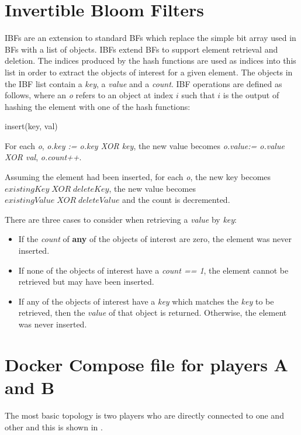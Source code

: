 \begin{appendices}

\chapter{Invertible Bloom Filters}\label{app:IBF}


IBFs are an extension to standard BFs which replace the simple bit array used in BFs with a list of objects. IBFs extend BFs to support element retrieval and deletion. The indices produced by the hash functions are used as indices into this list in order to extract the objects of interest for a given element. The objects in the IBF list contain a \textit{key}, a \textit{value} and a \textit{count}. IBF operations are defined as follows, where an \textit{o} refers to an object at index $i$ such that $i$ is the output of hashing the element with one of the hash functions:

\begin{labeling}{insert(key, val)  }
    \item[\textit{insert(key, val)}] For each \textit{o}, \textit{o.key := o.key XOR key}, the new value becomes \textit{o.value:= o.value XOR val}, \textit{o.count++}. 
    \item[\textit{delete(key)}] Assuming the element had been inserted, for each \textit{o}, the new key becomes $existingKey\;XOR\;deleteKey$, the new value becomes $existingValue\;XOR\;deleteValue$ and the count is decremented.
    \item[\textit{get(key)}] There are three cases to consider when retrieving a \textit{value} by \textit{key}:
    \begin{itemize}
        \item If the \textit{count} of \textbf{any} of the objects of interest are zero, the element was never inserted. 
        \item If none of the objects of interest have a \textit{count == 1}, the element cannot be retrieved but may have been inserted. \item If any of the objects of interest have a \textit{key} which matches the \textit{key} to be retrieved, then the \textit{value} of that object is returned. Otherwise, the element was never inserted.
    \end{itemize}
\end{labeling}





\chapter{Docker Compose file for players A and B}\label{app:docker-two-players}
The most basic topology is two players who are directly connected to one and other and this is shown in . 


\end{appendices}
